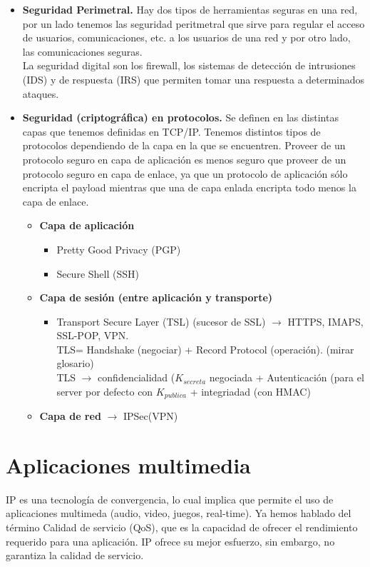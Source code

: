\documentclass[a4paper,11pt]{article}
\begin{document}
\begin{itemize}
\item \textbf{Seguridad Perimetral.} Hay dos tipos de herramientas seguras en una red, por un lado tenemos las seguridad peritmetral que sirve para regular el acceso de usuarios, comunicaciones, etc. a los usuarios de una red y por otro lado, las comunicaciones seguras. \\

La seguridad digital son los firewall, los sistemas de detección de intrusiones (IDS) y de respuesta (IRS) que permiten tomar una respuesta a determinados ataques.

\item \textbf{Seguridad (criptográfica) en protocolos.} Se definen en las distintas capas que tenemos definidas en TCP/IP. Tenemos distintos tipos de protocolos dependiendo de la capa en la que se encuentren. Proveer de un protocolo seguro en capa de aplicación es menos seguro que proveer de un protocolo seguro en capa de enlace, ya que un protocolo de aplicación sólo encripta el payload mientras que una de capa enlada encripta todo menos la capa de enlace.
	\begin{itemize}
		\item \textbf{Capa de aplicación}
			\begin{itemize}
				\item Pretty Good Privacy (PGP)
				\item Secure Shell (SSH)
			\end{itemize}
		\item \textbf{Capa de sesión (entre aplicación y transporte)}
			\begin{itemize}
				\item Transport Secure Layer (TSL) (sucesor de SSL) $\rightarrow$ HTTPS, IMAPS, SSL-POP, VPN. \\
				TLS= Handshake (negociar) + Record Protocol (operación). (mirar glosario) \\
				TLS $\rightarrow$ confidencialidad ($K_{secreta}$ negociada + Autenticación (para el server por defecto con $K_{publica}$ + integriadad (con HMAC)
			\end{itemize}
		\item \textbf{Capa de red} $\rightarrow$ IPSec(VPN)
	\end{itemize}
\end{itemize}

\section{Aplicaciones multimedia}
IP es una tecnología de convergencia, lo cual implica que permite el uso de aplicaciones multimeda (audio, video, juegos, real-time). Ya hemos hablado del término Calidad de servicio (QoS), que es la capacidad de ofrecer el rendimiento requerido para una aplicación. IP ofrece su mejor esfuerzo, sin embargo, no garantiza la calidad de servicio. \\
\end{document}
